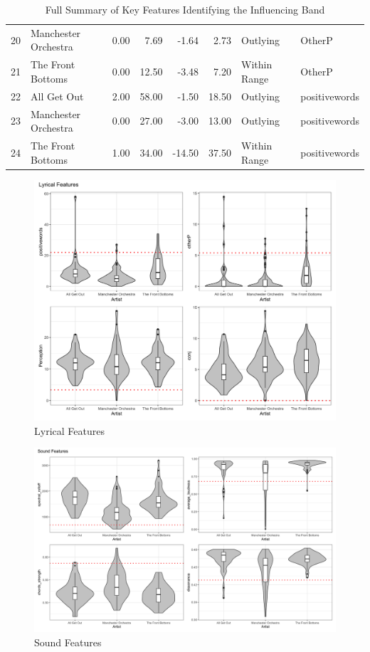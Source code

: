 \documentclass{article}\usepackage[]{graphicx}\usepackage[]{xcolor}
\begin{document}
\begin{table}[ht]
\begin{tabular}{rlrrrrll}
  20 & Manchester Orchestra & 0.00 & 7.69 & -1.64 & 2.73 & Outlying & OtherP \\ 
  21 & The Front Bottoms & 0.00 & 12.50 & -3.48 & 7.20 & Within Range & OtherP \\ 
  22 & All Get Out & 2.00 & 58.00 & -1.50 & 18.50 & Outlying & positivewords \\ 
  23 & Manchester Orchestra & 0.00 & 27.00 & -3.00 & 13.00 & Outlying & positivewords \\ 
  24 & The Front Bottoms & 1.00 & 34.00 & -14.50 & 37.50 & Within Range & positivewords \\ 
   \hline
\end{tabular}
\caption{Full Summary of Key Features Identifying the Influencing Band} 
\end{table}

\begin{figure}[H]
\begin{center}
  \includegraphics[width=\textwidth]{LyricFeaturesPlot.png}
  \caption{Lyrical Features}
  \label{lyricallarge}
\end{center}
\end{figure}

\begin{figure}[H]
\begin{center}
  \includegraphics[width=\textwidth]{SoundFeaturesPlot.png}
  \caption{Sound Features}
  \label{soundlarge}
\end{center}
\end{figure}
\end{document}
